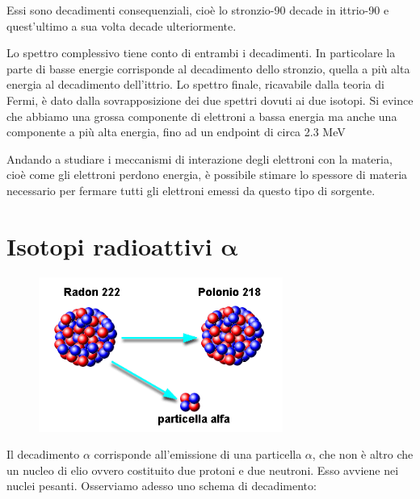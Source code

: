\vspace{0.2cm}Essi sono decadimenti consequenziali, cioè lo stronzio-90 decade in ittrio-90 e quest'ultimo a sua volta decade ulteriormente.

Lo spettro complessivo tiene conto di entrambi i decadimenti. In particolare la parte di basse energie corrisponde al decadimento dello stronzio, quella a più alta energia al decadimento dell'ittrio. Lo spettro finale, ricavabile dalla teoria di Fermi, è dato dalla sovrapposizione dei due spettri dovuti ai due isotopi. Si evince che abbiamo una grossa componente di elettroni a bassa energia ma anche una componente a più alta energia, fino ad un endpoint di circa 2.3 MeV

Andando a studiare i meccanismi di interazione degli elettroni con la materia, cioè come gli elettroni perdono energia, è possibile stimare lo spessore di materia necessario per fermare tutti gli elettroni emessi da questo tipo di sorgente.

\section[Isotopi radioattivi \texorpdfstring{$\alpha$}{\textalpha}]
{Isotopi radioattivi $\boldsymbol{\alpha}$}

\vspace{-0.6cm}\begin{figure}[H]
    \centering
    \includegraphics[width=8cm]{immagini/decadimento_alfa.png}
\end{figure}

\vspace{-0.2cm}Il decadimento $\alpha$ corrisponde all'emissione di una particella $\alpha$, che non è altro che un nucleo di elio ovvero costituito due protoni e due neutroni. Esso avviene nei nuclei pesanti. Osserviamo adesso uno schema di decadimento:

